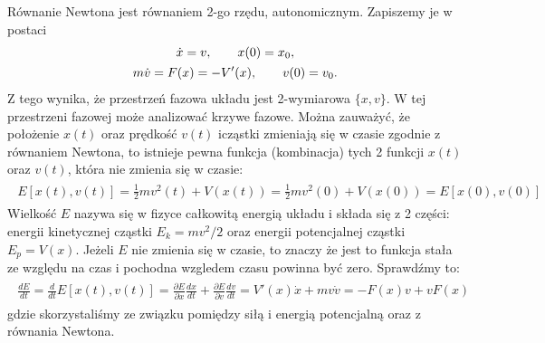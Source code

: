 \documentclass[a4paper,12pt,polish]{sphinxmanual}
\begin{document}
Równanie Newtona jest równaniem 2-go rzędu, autonomicznym.   Zapiszemy je w postaci
\label{ch1/chI022:equation-eqn3}\begin{gather}
\begin{split}\dot x = v, \quad \quad x(0)=x_0,\end{split}\label{ch1/chI022-eqn3}\\\begin{split}m\dot v = F(x) = -V'(x),  \qquad v(0)=v_0.\end{split}\notag
\end{gather}
Z tego wynika, że przestrzeń fazowa układu jest 2-wymiarowa $\{x, v\}$. W tej przestrzeni fazowej może analizować krzywe fazowe. Można zauważyć, że położenie $x(t)$ oraz prędkość $v(t)$ icząstki zmieniają się w czasie zgodnie z równaniem Newtona, to istnieje pewna funkcja (kombinacja) tych 2 funkcji $x(t)$ oraz $v(t)$, która nie zmienia się w czasie:
\label{ch1/chI022:equation-eqn4}\begin{gather}
\begin{split}E[x(t), v(t)] = \frac{1}{2} m v^2(t) + V(x(t)) = \frac{1}{2} m v^2(0) + V(x(0)) = E[x(0), v(0)]\end{split}\label{ch1/chI022-eqn4}
\end{gather}
Wielkość $E$ nazywa się  w fizyce całkowitą energią układu i składa się z 2 części: energii kinetycznej cząstki $E_k=mv^2/2$ oraz energii potencjalnej  cząstki $E_p = V(x)$. Jeżeli $E$ nie zmienia się w czasie, to znaczy że jest to funkcja stała ze względu na czas i pochodna wzgledem czasu powinna być zero. Sprawdźmy to:
\label{ch1/chI022:equation-eqn5}\begin{gather}
\begin{split}\frac{dE}{dt} = \frac{d}{dt}  E[x(t), v(t)] = \frac{\partial E}{\partial x}  \frac{dx}{dt} + \frac{\partial E}{\partial v}  \frac{dv}{dt} =  V'(x)  \dot x +  mv \dot v = -F(x) v + v F(x)\end{split}\label{ch1/chI022-eqn5}
\end{gather}
gdzie skorzystaliśmy ze związku pomiędzy siłą i energią potencjalną oraz z równania Newtona.
\end{document}
